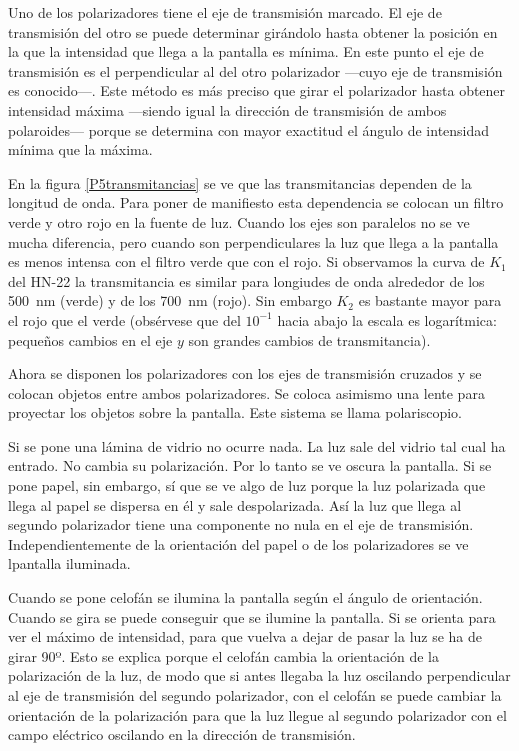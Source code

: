 \documentclass[12pt]{article}
\numberwithin{table}{section}
\numberwithin{figure}{section}
\numberwithin{equation}{section}
\begin{document}
Uno de los polarizadores tiene el eje de transmisión marcado. El eje de transmisión del otro se puede determinar girándolo hasta obtener la posición en la que la intensidad que llega a la pantalla es mínima. En este punto el eje de transmisión es el perpendicular al del otro polarizador ---cuyo eje de transmisión es conocido---. Este método es más preciso que girar el polarizador hasta obtener intensidad máxima ---siendo igual la dirección de transmisión de ambos polaroides--- porque se determina con mayor exactitud el ángulo de intensidad mínima que la máxima.

En la figura \ref{P5transmitancias} se ve que las transmitancias dependen de la longitud de onda. Para poner de manifiesto esta dependencia se colocan un filtro verde y otro rojo en la fuente de luz. Cuando los ejes son paralelos no se ve mucha diferencia, pero cuando son perpendiculares la luz que llega a la pantalla es menos intensa con el filtro verde que con el rojo. Si observamos la curva de $K_1$ del HN-22 la transmitancia es similar para longiudes de onda alrededor de los \SI{500}{nm} (verde) y de los \SI{700}{nm} (rojo). Sin embargo $K_2$ es bastante mayor para el rojo que el verde (obsérvese que del $10^{-1}$ hacia abajo la escala es logarítmica: pequeños cambios en el eje $y$ son grandes cambios de transmitancia).

Ahora se disponen los polarizadores con los ejes de transmisión cruzados y se colocan objetos entre ambos polarizadores. Se coloca asimismo una lente para proyectar los objetos sobre la pantalla. Este sistema se llama polariscopio.

Si se pone una lámina de vidrio no ocurre nada. La luz sale del vidrio tal cual ha entrado. No cambia su polarización. Por lo tanto se ve oscura la pantalla. Si se pone papel, sin embargo, sí que se ve algo de luz porque la luz polarizada que llega al papel se dispersa en él y sale despolarizada. Así la luz que llega al segundo polarizador tiene una componente no nula en el eje de transmisión. Independientemente de la orientación del papel o de los polarizadores se ve lpantalla iluminada.

Cuando se pone celofán se ilumina la pantalla según el ángulo de orientación. Cuando se gira se puede conseguir que se ilumine la pantalla. Si se orienta para ver el máximo de intensidad, para que vuelva a dejar de pasar la luz se ha de girar 90º. Esto se explica porque el celofán cambia la orientación de la polarización de la luz, de modo que si antes llegaba la luz oscilando perpendicular al eje de transmisión del segundo polarizador, con el celofán se puede cambiar la orientación de la polarización para que la luz llegue al segundo polarizador con el campo eléctrico oscilando en la dirección de transmisión.
\end{document}
